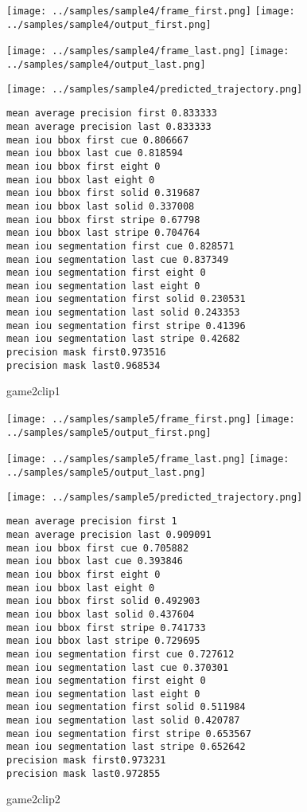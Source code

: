 \begin{figure}
\texttt{[image: ../samples/sample4/frame\_first.png]}
\texttt{[image: ../samples/sample4/output\_first.png]}\par
\texttt{[image: ../samples/sample4/frame\_last.png]}
\texttt{[image: ../samples/sample4/output\_last.png]}\par
\texttt{[image: ../samples/sample4/predicted\_trajectory.png]}
\caption{game2clip1}
\begin{verbatim}
mean average precision first 0.833333
mean average precision last 0.833333
mean iou bbox first cue 0.806667
mean iou bbox last cue 0.818594
mean iou bbox first eight 0
mean iou bbox last eight 0
mean iou bbox first solid 0.319687
mean iou bbox last solid 0.337008
mean iou bbox first stripe 0.67798
mean iou bbox last stripe 0.704764
mean iou segmentation first cue 0.828571
mean iou segmentation last cue 0.837349
mean iou segmentation first eight 0
mean iou segmentation last eight 0
mean iou segmentation first solid 0.230531
mean iou segmentation last solid 0.243353
mean iou segmentation first stripe 0.41396
mean iou segmentation last stripe 0.42682
precision mask first0.973516
precision mask last0.968534
\end{verbatim}
\end{figure}

\begin{figure}
\texttt{[image: ../samples/sample5/frame\_first.png]}
\texttt{[image: ../samples/sample5/output\_first.png]}\par
\texttt{[image: ../samples/sample5/frame\_last.png]}
\texttt{[image: ../samples/sample5/output\_last.png]}\par
\texttt{[image: ../samples/sample5/predicted\_trajectory.png]}
\caption{game2clip2}
\begin{verbatim}
mean average precision first 1
mean average precision last 0.909091
mean iou bbox first cue 0.705882
mean iou bbox last cue 0.393846
mean iou bbox first eight 0
mean iou bbox last eight 0
mean iou bbox first solid 0.492903
mean iou bbox last solid 0.437604
mean iou bbox first stripe 0.741733
mean iou bbox last stripe 0.729695
mean iou segmentation first cue 0.727612
mean iou segmentation last cue 0.370301
mean iou segmentation first eight 0
mean iou segmentation last eight 0
mean iou segmentation first solid 0.511984
mean iou segmentation last solid 0.420787
mean iou segmentation first stripe 0.653567
mean iou segmentation last stripe 0.652642
precision mask first0.973231
precision mask last0.972855
\end{verbatim}
\end{figure}

